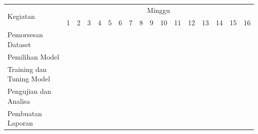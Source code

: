 \newcommand{\w}{}
\newcommand{\G}{\cellcolor{gray}}
\begin{table}[h!]
  \begin{tabular}{|p{3.5cm}|c|c|c|c|c|c|c|c|c|c|c|c|c|c|c|c|}

    \hline
    \multirow{2}{*}{Kegiatan} & \multicolumn{16}{|c|}{Minggu} \\
    \cline{2-17} &
    1 & 2 & 3 & 4 & 5 & 6 & 7 & 8 & 9 & 10 & 11 & 12 & 13 & 14 & 15 & 16 \\
    \hline

    Pemorsesan Dataset &
    \G & \G & \w & \w & \w & \w & \w & \w & \w & \w & \w & \w & \w & \w & \w & \w \\
    \hline

    Pemilihan Model &
    \w & \w & \G & \G & \G & \G & \G & \w & \w & \w & \w & \w & \w & \w & \w & \w \\
    \hline

    Training dan Tuning Model &
    \w & \w & \w & \w & \G & \G & \G & \G & \G & \G & \G & \w & \w & \w & \w & \w \\
    \hline

    Pengujian dan Analisa &
    \w & \w & \w & \w & \w & \w & \w & \w & \w & \w & \w & \G & \G & \G & \w & \w \\
    \hline
    
    Pembuatan Laporan &
    \G & \G & \G & \G & \G & \G & \G & \G & \G & \G & \G & \G & \G & \G & \G & \G \\
    \hline

  \end{tabular}
\end{table}